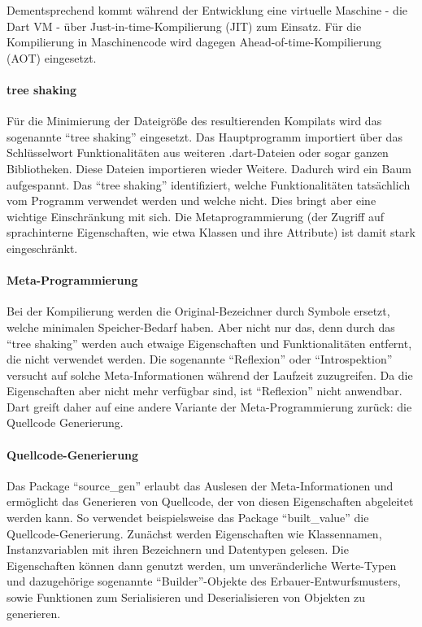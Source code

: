 Dementsprechend kommt während der Entwicklung eine virtuelle Maschine - die Dart VM - über Just-in-time-Kompilierung (JIT) zum Einsatz.
Für die Kompilierung in Maschinencode wird dagegen Ahead-of-time-Kompilierung (AOT) eingesetzt.

\paragraph{tree shaking}
Für die Minimierung der Dateigröße des resultierenden Kompilats wird das sogenannte \enquote{tree shaking} eingesetzt.
Das Hauptprogramm importiert über das Schlüsselwort  Funktionalitäten aus  weiteren .dart-Dateien oder sogar ganzen Bibliotheken.
Diese Dateien importieren wieder Weitere.
Dadurch wird ein Baum aufgespannt.
Das \enquote{tree shaking} identifiziert, welche Funktionalitäten tatsächlich vom Programm verwendet werden und welche nicht.
Dies bringt aber eine wichtige Einschränkung mit sich.
Die Metaprogrammierung (der Zugriff auf sprachinterne Eigenschaften, wie etwa Klassen und ihre Attribute) ist damit stark eingeschränkt.

\paragraph{Meta-Programmierung}
Bei der Kompilierung werden die Original-Bezeichner durch Symbole ersetzt, welche minimalen Speicher-Bedarf haben.
Aber nicht nur das, denn durch das \enquote{tree shaking} werden auch etwaige Eigenschaften und Funktionalitäten entfernt, die nicht verwendet werden.
Die sogenannte \enquote{Reflexion} oder \enquote{Introspektion} versucht auf solche Meta-Informationen während der Laufzeit zuzugreifen.
Da die Eigenschaften aber nicht mehr verfügbar sind, ist \enquote{Reflexion} nicht anwendbar.
Dart greift daher auf eine andere Variante der Meta-Programmierung zurück: die Quellcode Generierung.

\paragraph{Quellcode-Generierung}
Das Package \enquote{source_gen} erlaubt das Auslesen der Meta-Informationen und ermöglicht das Generieren von Quellcode, der von diesen Eigenschaften abgeleitet werden kann.
So verwendet beispielsweise das Package \enquote{built_value} die Quellcode-Generierung.
Zunächst werden Eigenschaften wie Klassennamen, Instanzvariablen mit ihren Bezeichnern und Datentypen gelesen.
Die Eigenschaften können dann genutzt werden, um unveränderliche Werte-Typen und dazugehörige sogenannte \enquote{Builder}-Objekte des Erbauer-Entwurfsmusters, sowie Funktionen zum Serialisieren und Deserialisieren von Objekten zu generieren.


